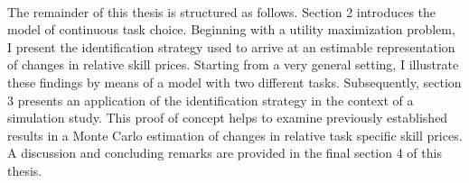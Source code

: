 \documentclass[../main.tex]{subfiles}
\begin{document}
\\ 
The remainder of this thesis is structured as follows. Section 2 introduces the model of continuous task choice. Beginning with a utility maximization problem, I present the identification strategy used to arrive at an estimable representation of changes in relative skill prices. Starting from a very general setting, I illustrate these findings by means of a model with two different tasks. Subsequently, section 3  presents an application of the identification strategy in the context of a simulation study. This proof of concept helps to examine previously established results in a Monte Carlo estimation of changes in relative task specific skill prices. A discussion and concluding remarks are provided in the final section 4 of this thesis.
\end{document}
